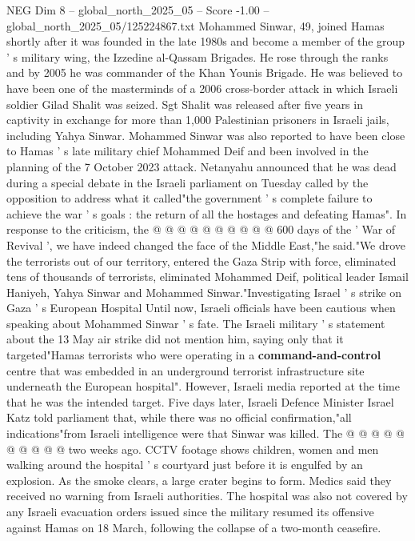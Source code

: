 \begin{textsample}{NEG Dim 8 – global\_north\_2025\_05 – Score -1.00 – global\_north\_2025\_05/125224867.txt}  \label{ex:f8_neg_409}
Mohammed Sinwar, 49, joined Hamas shortly after it was founded in the late 1980s and become a member of the group ' s military wing, the Izzedine al-Qassam Brigades.
He rose through the ranks and by 2005 he was commander of the Khan Younis Brigade.
He was believed to have been one of the masterminds of a 2006 cross-border attack in which Israeli soldier Gilad Shalit was seized.
Sgt Shalit was released after five years in captivity in exchange for more than 1,000 Palestinian prisoners in Israeli jails, including Yahya Sinwar.
Mohammed Sinwar was also reported to have been close to Hamas ' s late military chief Mohammed Deif and been involved in the planning of the 7 October 2023 attack.
Netanyahu announced that he was dead during a special debate in the Israeli parliament on Tuesday called by the opposition to address what it called"the government ' s complete failure to achieve the war ' s goals : the return of all the hostages and defeating Hamas".
In response to the criticism, the @ @ @ @ @ @ @ @ @ @ 600 days of the ' War of Revival ', we have indeed changed the face of the Middle East,"he said."We drove the terrorists out of our territory, entered the Gaza Strip with force, eliminated tens of thousands of terrorists, eliminated Mohammed Deif, political leader Ismail Haniyeh, Yahya Sinwar and Mohammed Sinwar."Investigating Israel ' s strike on Gaza ' s European Hospital Until now, Israeli officials have been cautious when speaking about Mohammed Sinwar ' s fate.
The Israeli military ' s statement about the 13 May air strike did not mention him, saying only that it targeted"Hamas terrorists who were operating in a \textbf{command-and-control} centre that was embedded in an underground terrorist infrastructure site underneath the European hospital".
However, Israeli media reported at the time that he was the intended target.
Five days later, Israeli Defence Minister Israel Katz told parliament that, while there was no official confirmation,"all indications"from Israeli intelligence were that Sinwar was killed.
The @ @ @ @ @ @ @ @ @ @ two weeks ago.
CCTV footage shows children, women and men walking around the hospital ' s courtyard just before it is engulfed by an explosion.
As the smoke clears, a large crater begins to form.
Medics said they received no warning from Israeli authorities.
The hospital was also not covered by any Israeli evacuation orders issued since the military resumed its offensive against Hamas on 18 March, following the collapse of a two-month ceasefire.

\end{textsample}
